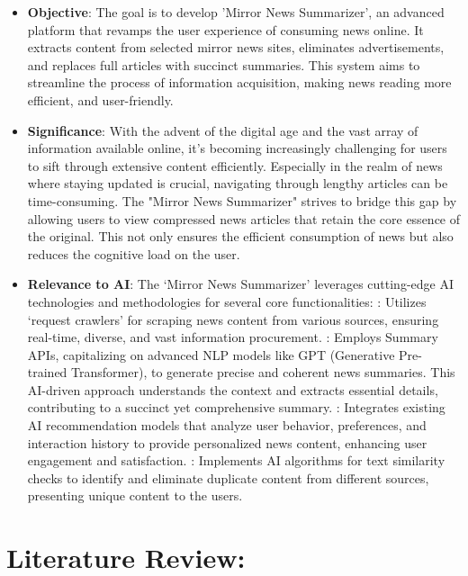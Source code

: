 \documentclass[a4paper]{article}
\begin{document}
\begin{itemize}
    \item {\bf Objective}: The goal is to develop 'Mirror News Summarizer', an advanced platform that revamps the user experience of consuming news online. It extracts content from selected mirror news sites, eliminates advertisements, and replaces full articles with succinct summaries. This system aims to streamline the process of information acquisition, making news reading more efficient, and user-friendly.
    \item {\bf Significance}: With the advent of the digital age and the vast array of information available online, it's becoming increasingly challenging for users to sift through extensive content efficiently. Especially in the realm of news where staying updated is crucial, navigating through lengthy articles can be time-consuming. The "Mirror News Summarizer" strives to bridge this gap by allowing users to view compressed news articles that retain the core essence of the original. This not only ensures the efficient consumption of news but also reduces the cognitive load on the user.
    \item {\bf Relevance to AI}: The `Mirror News Summarizer' leverages cutting-edge AI technologies and methodologies for several core functionalities:
    : Utilizes `request crawlers' for scraping news content from various sources, ensuring real-time, diverse, and vast information procurement.
    : Employs Summary APIs, capitalizing on advanced NLP models like GPT (Generative Pre-trained Transformer), to generate precise and coherent news summaries. This AI-driven approach understands the context and extracts essential details, contributing to a succinct yet comprehensive summary.
    : Integrates existing AI recommendation models that analyze user behavior, preferences, and interaction history to provide personalized news content, enhancing user engagement and satisfaction.
    : Implements AI algorithms for text similarity checks to identify and eliminate duplicate content from different sources, presenting unique content to the users.
\end{itemize}

\section{Literature Review:}
\end{document}
